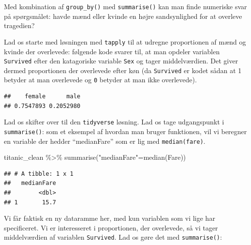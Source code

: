 \documentclass[
]{book}
\newenvironment{Shaded}{\begin{snugshade}}{\end{snugshade}}
\newcommand{\CommentTok}[1]{\textcolor[rgb]{0.56,0.35,0.01}{\textit{#1}}}
\newcommand{\FunctionTok}[1]{\textcolor[rgb]{0.00,0.00,0.00}{#1}}
\newcommand{\NormalTok}[1]{#1}
\newcommand{\OtherTok}[1]{\textcolor[rgb]{0.56,0.35,0.01}{#1}}
\newcommand{\SpecialCharTok}[1]{\textcolor[rgb]{0.00,0.00,0.00}{#1}}
\newcommand{\StringTok}[1]{\textcolor[rgb]{0.31,0.60,0.02}{#1}}
\begin{document}
Med kombination af \texttt{group\_by()} med \texttt{summarise()} kan man finde numeriske svar på spørgsmålet: havde mænd eller kvinde en højre sandsynlighed for at overleve tragedien?

Lad os starte med løsningen med \texttt{tapply} til at udregne proportionen af mænd og kvinde der overlevede: følgende kode svarer til, at man opdeler variablen \texttt{Survived} efter den katagoriske variable \texttt{Sex} og tager middelværdien. Det giver dermed proportionen der overlevede efter køn (da \texttt{Survived} er kodet sådan at 1 betyder at man overlevede og \texttt{0} betyder at man ikke overlevede).

\begin{Shaded}
\end{Shaded}

\begin{verbatim}
##    female      male 
## 0.7547893 0.2052980
\end{verbatim}

Lad os skifter over til den \texttt{tidyverse} løsning. Lad os tage udgangspunkt i \texttt{summarise()}: som et eksempel af hvordan man bruger funktionen, vil vi beregner en variable der hedder ``medianFare'' som er lig med \texttt{median(fare)}.

\begin{Shaded}
\begin{Highlighting}[]
\NormalTok{titanic\_clean }\SpecialCharTok{\%\textgreater{}\%}
  \FunctionTok{summarise}\NormalTok{(}\StringTok{"medianFare"}\OtherTok{=}\FunctionTok{median}\NormalTok{(Fare))}
\end{Highlighting}
\end{Shaded}

\begin{verbatim}
## # A tibble: 1 x 1
##   medianFare
##        <dbl>
## 1       15.7
\end{verbatim}

Vi får faktisk en ny dataramme her, med kun variablen som vi lige har specificeret. Vi er interesseret i proportionen, der overlevede, så vi tager middelværdien af variablen \texttt{Survived}. Lad os gøre det med \texttt{summarise()}:
\end{document}
